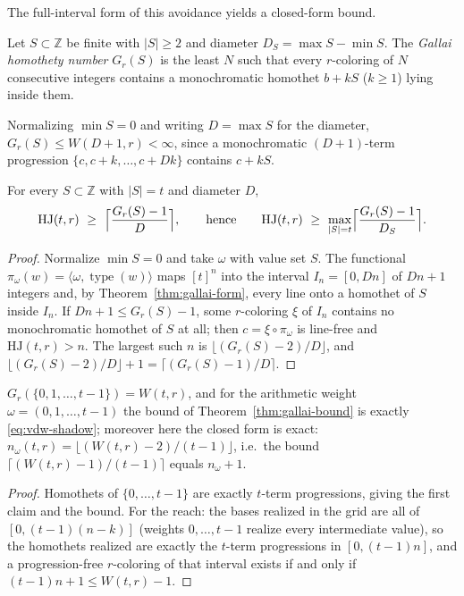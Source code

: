 \documentclass[12pt]{article}
\newcommand{\HJ}{\mathrm{HJ}}
\newcommand{\Wvdw}{W}
\newcommand{\Z}{\mathbb{Z}}
\DeclareMathOperator{\type}{type}
\begin{document}
The full-interval form of this avoidance yields a closed-form bound.

\begin{definition}\label{def:gallai-number}
Let $S\subset\Z$ be finite with $|S|\ge 2$ and diameter
$D_{S}=\max S-\min S$. The \emph{Gallai homothety number} $G_{r}(S)$
is the least $N$ such that every $r$-coloring of $N$ consecutive
integers contains a monochromatic homothet $b+kS$ ($k\ge 1$) lying
inside them.
\end{definition}

Normalizing $\min S=0$ and writing $D=\max S$ for the diameter,
$G_{r}(S)\le\Wvdw(D+1,r)<\infty$, since a monochromatic $(D+1)$-term
progression $\{c,c+k,\dots,c+Dk\}$ contains $c+kS$.

\begin{theorem}\label{thm:gallai-bound}
For every $S\subset\Z$ with $|S|=t$ and diameter $D$,
\[
\HJ(t,r)\ \ge\ \Bigl\lceil\frac{G_{r}(S)-1}{D}\Bigr\rceil,
\qquad\text{hence}\qquad
\HJ(t,r)\ \ge\ \max_{|S|=t}
\Bigl\lceil\frac{G_{r}(S)-1}{D_{S}}\Bigr\rceil .
\]
\end{theorem}

\begin{proof}
Normalize $\min S=0$ and take $\omega$ with value set $S$. The
functional $\pi_{\omega}(w)=\langle\omega,\type(w)\rangle$ maps
$[t]^{n}$ into the interval $I_{n}=[0,Dn]$ of $Dn+1$ integers and, by
Theorem~\ref{thm:gallai-form}, every line onto a homothet of $S$ inside
$I_{n}$. If $Dn+1\le G_{r}(S)-1$, some $r$-coloring $\xi$ of $I_{n}$
contains no monochromatic homothet of $S$ at all; then
$c=\xi\circ\pi_{\omega}$ is line-free and $\HJ(t,r)>n$. The largest
such $n$ is $\lfloor(G_{r}(S)-2)/D\rfloor$, and
$\lfloor(G_{r}(S)-2)/D\rfloor+1=\lceil(G_{r}(S)-1)/D\rceil$.
\end{proof}

\begin{corollary}[Arithmetic weight $=$ van der Waerden]\label{cor:arith}
$G_{r}(\{0,1,\dots,t-1\})=\Wvdw(t,r)$, and for the arithmetic weight
$\omega=(0,1,\dots,t-1)$ the bound of
Theorem~\ref{thm:gallai-bound} is exactly \eqref{eq:vdw-shadow};
moreover here the closed form is exact:
$n_{\omega}(t,r)=\lfloor(\Wvdw(t,r)-2)/(t-1)\rfloor$, i.e.\ the bound
$\lceil(\Wvdw(t,r)-1)/(t-1)\rceil$ equals $n_{\omega}+1$.
\end{corollary}

\begin{proof}
Homothets of $\{0,\dots,t-1\}$ are exactly $t$-term progressions,
giving the first claim and the bound. For the reach: the bases realized
in the grid are all of $[0,(t-1)(n-k)]$ (weights $0,\dots,t-1$ realize
every intermediate value), so the homothets realized are exactly the
$t$-term progressions in $[0,(t-1)n]$, and a progression-free
$r$-coloring of that interval exists if and only if
$(t-1)n+1\le\Wvdw(t,r)-1$.
\end{proof}
\end{document}
